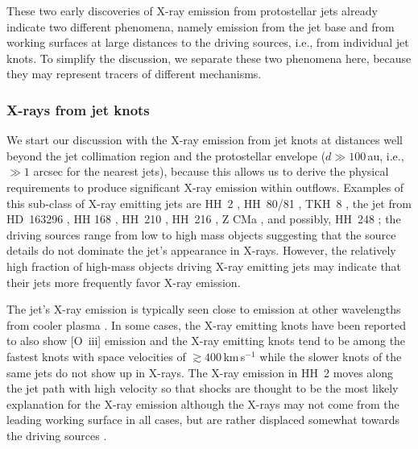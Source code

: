 These two early discoveries of X-ray emission  from protostellar jets already indicate two different phenomena, namely emission from the jet base and from working surfaces at large distances to the driving sources, i.e., from individual jet knots. To simplify the discussion, we separate these two phenomena here, because they may represent tracers of different mechanisms.


\subsubsection{X-rays from jet knots}

We start our discussion with the X-ray emission from jet knots at distances well beyond the jet collimation region and the protostellar envelope ($d\gg100\,$au, i.e., $\gg1$ arcsec for the nearest jets), because this allows us to derive the physical requirements to produce significant X-ray emission within outflows. Examples of this sub-class of X-ray emitting jets are HH~2 \citep{Pravdo_2001}, HH~80/81 \citep{Pravdo_2004}, TKH~8 \citep{Tsujimoto_2004}, the jet from HD~163296 \citep[HH~409][]{Swartz_2005,Guenther_2013},   HH 168 \citep{Pravdo_2005,Schneider_2009}, HH~210 \citep{Grosso_2006}, HH~216 \citep{Linsky_2007}, Z CMa \citep{Stelzer_2009}, and possibly, HH~248 \citep{Lopez_2015}; the driving sources range from low to high mass objects suggesting that 
the source details do not dominate the jet's appearance in X-rays. However, the relatively high fraction of high-mass objects driving X-ray emitting jets may indicate that their jets more frequently favor X-ray emission. 


The jet's X-ray emission is typically seen close to emission at other wavelengths from cooler plasma   \citep[$T\sim10^4$\,K, e.g.,][]{Pravdo_2004,Grosso_2006,Schneider_2012}.  In some cases, the X-ray emitting knots have been reported to also show [O~{\sc iii}] emission \citep[$T\sim10^5$\,K, see ][]{Grosso_2006}  and the X-ray emitting knots tend to be among the fastest knots with space velocities of $\gtrsim400$\,km\,s$^{-1}$ \citep[e.g.,][]{Pravdo_2001} while the slower knots of the same jets do not show up in X-rays. The X-ray emission in HH~2  moves along the jet path with high velocity \citep{Schneider_2012} so that shocks are thought to be the most likely explanation for the X-ray emission although the X-rays may not come from the leading working surface in all cases, but are rather displaced somewhat towards the driving sources \citep[][]{Pravdo_2005}.

